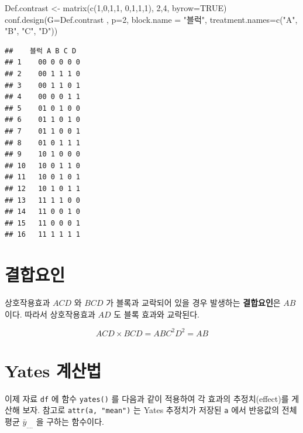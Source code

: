 \documentclass[
]{book}
\newenvironment{Shaded}{\begin{snugshade}}{\end{snugshade}}
\newcommand{\AttributeTok}[1]{\textcolor[rgb]{0.77,0.63,0.00}{#1}}
\newcommand{\ConstantTok}[1]{\textcolor[rgb]{0.00,0.00,0.00}{#1}}
\newcommand{\DecValTok}[1]{\textcolor[rgb]{0.00,0.00,0.81}{#1}}
\newcommand{\FunctionTok}[1]{\textcolor[rgb]{0.00,0.00,0.00}{#1}}
\newcommand{\NormalTok}[1]{#1}
\newcommand{\OtherTok}[1]{\textcolor[rgb]{0.56,0.35,0.01}{#1}}
\newcommand{\StringTok}[1]{\textcolor[rgb]{0.31,0.60,0.02}{#1}}
\begin{document}
\begin{Shaded}
\begin{Highlighting}[]
\NormalTok{Def.contrast }\OtherTok{\textless{}{-}}   \FunctionTok{matrix}\NormalTok{(}\FunctionTok{c}\NormalTok{(}\DecValTok{1}\NormalTok{,}\DecValTok{0}\NormalTok{,}\DecValTok{1}\NormalTok{,}\DecValTok{1}\NormalTok{, }\DecValTok{0}\NormalTok{,}\DecValTok{1}\NormalTok{,}\DecValTok{1}\NormalTok{,}\DecValTok{1}\NormalTok{), }\DecValTok{2}\NormalTok{,}\DecValTok{4}\NormalTok{, }\AttributeTok{byrow=}\ConstantTok{TRUE}\NormalTok{)}
\FunctionTok{conf.design}\NormalTok{(}\AttributeTok{G=}\NormalTok{Def.contrast , }\AttributeTok{p=}\DecValTok{2}\NormalTok{, }\AttributeTok{block.name =} \StringTok{"블럭"}\NormalTok{, }\AttributeTok{treatment.names=}\FunctionTok{c}\NormalTok{(}\StringTok{"A"}\NormalTok{, }\StringTok{"B"}\NormalTok{, }\StringTok{"C"}\NormalTok{, }\StringTok{"D"}\NormalTok{))}
\end{Highlighting}
\end{Shaded}

\begin{verbatim}
##    블럭 A B C D
## 1    00 0 0 0 0
## 2    00 1 1 1 0
## 3    00 1 1 0 1
## 4    00 0 0 1 1
## 5    01 0 1 0 0
## 6    01 1 0 1 0
## 7    01 1 0 0 1
## 8    01 0 1 1 1
## 9    10 1 0 0 0
## 10   10 0 1 1 0
## 11   10 0 1 0 1
## 12   10 1 0 1 1
## 13   11 1 1 0 0
## 14   11 0 0 1 0
## 15   11 0 0 0 1
## 16   11 1 1 1 1
\end{verbatim}

\hypertarget{uxacb0uxd569uxc694uxc778}{%
\section{결합요인}\label{uxacb0uxd569uxc694uxc778}}

상호작용효과 \(ACD\) 와 \(BCD\) 가 블록과 교락되어 있을 경우 발생하는 \textbf{결합요인}은 \(AB\) 이다.
따라서 상호작용효과 \(AD\) 도 블록 효과와 교락된다.

\[ACD \times BCD = ABC^2 D^2= AB\]

\hypertarget{yates-uxacc4uxc0b0uxbc95}{%
\section{Yates 계산법}\label{yates-uxacc4uxc0b0uxbc95}}

이제 자료 \texttt{df} 에 함수 \texttt{yates()} 를 다음과 같이 적용하여 각 효과의 추정치(effect)를 게산해 보자.
참고로 \texttt{attr(a,\ "mean")} 는 Yates 추정치가 저장된 \texttt{a} 에서 반응값의 전체 평균 \(\bar y_{....}\) 을 구하는 함수이다.
\end{document}
